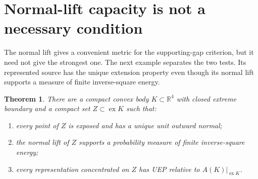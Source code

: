\documentclass[11pt,letterpaper]{amsart}
\newtheorem{theorem}{Theorem}[section]
\theoremstyle{definition}
\theoremstyle{remark}
\numberwithin{equation}{section}
\DeclareMathOperator{\ex}{ex}
\newcommand{\R}{\mathbb R}
\begin{document}
\appendix
\section{Normal-lift capacity is not a necessary condition}
\label{app:capacity}

The normal lift gives a convenient metric for the supporting-gap
criterion, but it need not give the strongest one. The next example
separates the two tests. Its represented source has the unique extension
property even though its normal lift supports a measure of finite
inverse-square energy.

\begin{theorem}\label{geom:thm}
There are a compact convex body $K\subset\R^4$ with closed extreme
boundary and a compact set $Z\subset\ex K$ such that:
\begin{enumerate}
\item every point of $Z$ is exposed and has a unique unit outward normal;
\item the normal lift of $Z$ supports a probability measure of finite
inverse-square energy;
\item every representation concentrated on $Z$ has UEP relative to $A(K)|_{\ex K}$.
\end{enumerate}
\end{theorem}
\end{document}
